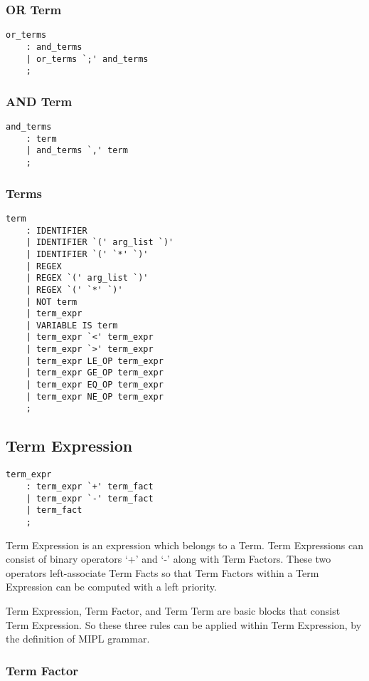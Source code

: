 \documentclass[prodmode,acmtecs]{acmsmall}
\begin{document}
\subsubsection{OR Term}
\begin{lstlisting}
or_terms
	: and_terms
	| or_terms `;' and_terms
	;
\end{lstlisting}

\subsubsection{AND Term}
\begin{lstlisting}
and_terms
	: term
	| and_terms `,' term	
	;
\end{lstlisting}

\subsubsection{Terms}
\begin{lstlisting}
term
	: IDENTIFIER		
	| IDENTIFIER `(' arg_list `)'
	| IDENTIFIER `(' `*' `)'
	| REGEX			
	| REGEX `(' arg_list `)'
	| REGEX `(' `*' `)'	
	| NOT term		
	| term_expr		
	| VARIABLE IS term	
	| term_expr `<' term_expr
	| term_expr `>' term_expr
	| term_expr LE_OP term_expr
	| term_expr GE_OP term_expr
	| term_expr EQ_OP term_expr
	| term_expr NE_OP term_expr
	;
\end{lstlisting}

\subsection{Term Expression}
\begin{lstlisting}
term_expr
	: term_expr `+' term_fact
	| term_expr `-' term_fact
	| term_fact
	;
\end{lstlisting}

Term Expression is an expression which belongs to a Term.  Term 
Expressions can consist of binary operators `+' and `-' along with Term
Factors. These two operators left-associate Term Facts so that Term
Factors within a Term Expression can be computed with a left priority.

Term Expression, Term Factor, and Term Term are basic blocks that
consist Term Expression.  So these three rules can be applied within
Term Expression, by the definition of MIPL grammar.
\medskip

\subsubsection{Term Factor}
\end{document}
